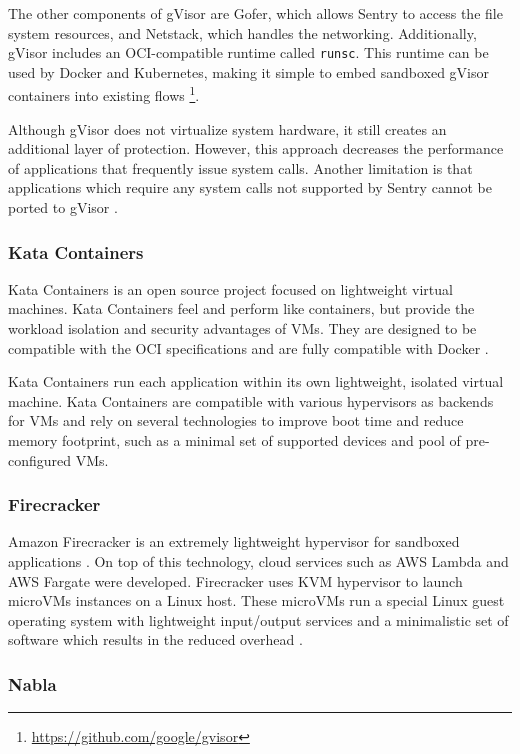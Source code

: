 The other components of gVisor are Gofer, which allows Sentry to access the file system resources, and Netstack, which handles the networking. Additionally, gVisor includes an OCI-compatible runtime called \texttt{runsc}. This runtime can be used by Docker and Kubernetes, making it simple to embed sandboxed gVisor containers into existing flows \footnote{\url{https://github.com/google/gvisor}}.

Although gVisor does not virtualize system hardware, it still creates an additional layer of protection. However, this approach decreases the performance of applications that frequently issue system calls. Another limitation is that applications which require any system calls not supported by Sentry cannot be ported to gVisor \cite{c:4}.

\subsubsection*{Kata Containers}

Kata Containers is an open source project focused on lightweight virtual machines. Kata Containers feel and perform like containers, but provide the workload isolation and security advantages of VMs. They are designed to be compatible with the OCI specifications and are fully compatible with Docker \cite{c:11}.

Kata Containers run each application within its own lightweight, isolated virtual machine. Kata Containers are compatible with various hypervisors as backends for VMs and rely on several technologies to improve boot time and reduce memory footprint, such as a minimal set of supported devices and pool of pre-configured VMs.

\subsubsection*{Firecracker}

Amazon Firecracker is an extremely lightweight hypervisor for sandboxed applications \cite{spr:1}. On top of this technology, cloud services such as AWS Lambda and AWS Fargate were developed. Firecracker uses KVM hypervisor to launch microVMs instances on a Linux host. These microVMs run a special Linux guest operating system with lightweight input/output services and a minimalistic set of software which results in the reduced overhead \cite{acm:3}.

\subsubsection*{Nabla}

